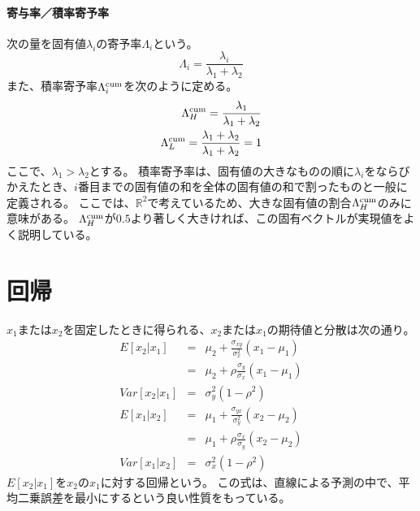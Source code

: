 \paragraph{寄与率／積率寄予率}
次の量を固有値$\lambda_i$の寄予率$\Lambda_i$という。
\begin{equation*}
 \Lambda_i = \frac{\lambda_i}{\lambda_1+\lambda_2}
\end{equation*}
また、積率寄予率$\Lambda_i^{\rm{cum}}$を次のように定める。
\begin{eqnarray*}
 \Lambda_H^{\rm{cum}} = \frac{\lambda_1}{\lambda_1+\lambda_2} \\
 \Lambda_L^{\rm{cum}} = \frac{\lambda_1+\lambda_2}{\lambda_1+\lambda_2} =1
\end{eqnarray*}
ここで、$\lambda_1>\lambda_2$とする。
積率寄予率は、固有値の大きなものの順に$\lambda_i$をならびかえたとき、$i$番目までの固有値の和を全体の固有値の和で割ったものと一般に定義される。
ここでは、$\mathbb{R}^2$で考えているため、大きな固有値の割合$\Lambda_H^{\rm{cum}}$のみに意味がある。
$\Lambda_H^{\rm{cum}}$が$0.5$より著しく大きければ、この固有ベクトルが実現値をよく説明している。




\section{回帰}
$x_1$または$x_2$を固定したときに得られる、$x_2$または$x_1$の期待値と分散は次の通り。
\begin{eqnarray*}
 E[x_2|x_1] &=& \mu_2+\frac{\sigma_{xy}}{\sigma_x^2}(x_1-\mu_1)\\
 &=& \mu_2+\rho\frac{\sigma_y}{\sigma_x}(x_1-\mu_1)\\
 Var[x_2|x_1]  &=& \sigma_y^2(1-\rho^2) \\
 E[x_1|x_2] &=& \mu_1+\frac{\sigma_{yx}}{\sigma_y^2}(x_2-\mu_2)\\
 &=& \mu_1+\rho\frac{\sigma_{x}}{\sigma_y}(x_2-\mu_2)\\
 Var[x_1|x_2]  &=& \sigma_x^2(1-\rho^2)
\end{eqnarray*}
$E[x_2|x_1]$を$x_2$の$x_1$に対する回帰という。
この式は、直線による予測の中で、平均二乗誤差を最小にするという良い性質をもっている。

